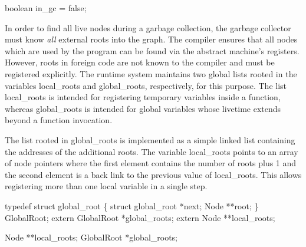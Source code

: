 \nwendcode{}\nwdocspar
\nwenddocs{}\plusendmoddef\nwstartdeflinemarkup{}\nwenddeflinemarkup
boolean in_gc = false;

\nwendcode{}\nwdocspar
In order to find all live nodes during a garbage collection, the
garbage collector must know \emph{all} external roots into the
graph. The compiler ensures that all nodes which are used by the
program can be found via the abstract machine's registers. However,
roots in foreign code are not known to the compiler and must be
registered explicitly. The runtime system maintains two global lists
rooted in the variables {\Tt{}local{\_}roots\nwendquote} and {\Tt{}global{\_}roots\nwendquote},
respectively, for this purpose. The list {\Tt{}local{\_}roots\nwendquote} is intended
for registering temporary variables inside a function, whereas
{\Tt{}global{\_}roots\nwendquote} is intended for global variables whose livetime
extends beyond a function invocation.                                        %

The list rooted in {\Tt{}global{\_}roots\nwendquote} is implemented as a simple linked
list containing the addresses of the additional roots. The
variable {\Tt{}local{\_}roots\nwendquote} points to an array of node pointers where the
first element contains the number of roots plus 1 and the second
element is a back link to the previous value of {\Tt{}local{\_}roots\nwendquote}. This
allows registering more than one local variable in a single step.

\nwenddocs{}\plusendmoddef\nwstartdeflinemarkup{}\nwenddeflinemarkup
typedef struct global_root \{
    struct global_root *next;
    Node           **root;
\} GlobalRoot;
extern GlobalRoot *global_roots;
extern Node       **local_roots;

\nwendcode{}\nwdocspar
\nwenddocs{}\plusendmoddef\nwstartdeflinemarkup{}\nwenddeflinemarkup
Node       **local_roots;
GlobalRoot *global_roots;

